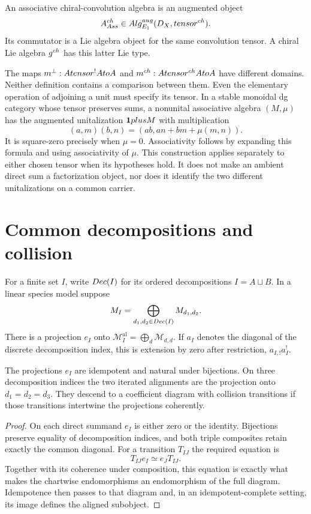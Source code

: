 \begin{definition}
An associative chiral-convolution algebra is an augmented object
\[
 A^{\ch}_{\mathsf{Ass}}\in
 \Alg_{\Eone}^{\mathrm{aug}}(\Dcal_X,\tensor^{\ch}).
\]
Its commutator is a Lie algebra object for the same convolution tensor.
A chiral Lie algebra $\g^{\ch}$ has this latter Lie type.
\end{definition}

The maps $m^\perp:A\tensor^!A\to A$ and
$m^{\ch}:A\tensor^{\ch}A\to A$ have different domains.
Neither definition contains a comparison between them.
Even the elementary operation of adjoining a unit must specify its tensor.
In a stable monoidal dg category whose tensor preserves sums, a nonunital
associative algebra $(M,\mu)$ has the augmented unitalization
$\mathbbm1\oplus M$ with multiplication
\[
 (a,m)(b,n)=(ab,an+bm+\mu(m,n)).
\]
It is square-zero precisely when $\mu=0$.
Associativity follows by expanding this formula and using associativity of $\mu$.
This construction applies separately to either chosen tensor when its hypotheses hold.
It does not make an ambient direct sum a factorization object, nor does it
identify the two different unitalizations on a common carrier.

\section{Common decompositions and collision}
For a finite set $I$, write $\Dec(I)$ for its ordered decompositions $I=A\sqcup B$.
In a linear species model suppose
\[
 \mathcal M_I=\bigoplus_{d_1,d_2\in\Dec(I)}\mathcal M_{d_1,d_2}.
\]
There is a projection $e_I$ onto
$\mathcal M_I^{\mathrm{al}}=\bigoplus_d\mathcal M_{d,d}$.
If $a_I$ denotes the diagonal of the discrete decomposition index, this is
extension by zero after restriction, $a_{I,!}a_I^!$.

\begin{proposition}
The projections $e_I$ are idempotent and natural under bijections.
On three decomposition indices the two iterated alignments are the projection
onto $d_1=d_2=d_3$.
They descend to a coefficient diagram with collision transitions if those
transitions intertwine the projections coherently.
\end{proposition}
\begin{proof}
On each direct summand $e_I$ is either zero or the identity.
Bijections preserve equality of decomposition indices, and both triple composites
retain exactly the common diagonal. For a transition $T_{IJ}$ the required equation is
\[
 T_{IJ}e_I\simeq e_JT_{IJ}.
\]
Together with its coherence under composition, this equation is exactly what
makes the chartwise endomorphisms an endomorphism of the full diagram.
Idempotence then passes to that diagram and, in an idempotent-complete setting,
its image defines the aligned subobject.
\end{proof}

